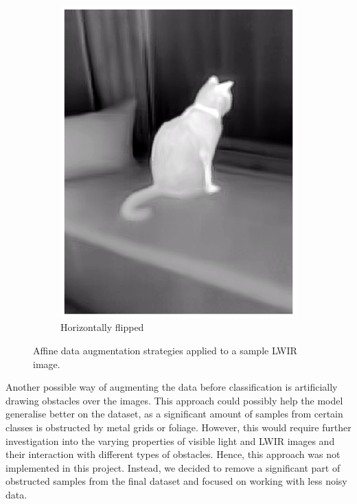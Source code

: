 \documentclass{l4proj}
\begin{document}
\begin{figure}[ht]
\begin{subfigure}[h!]{0.24\textwidth}
    \includegraphics[width=\textwidth]{images/augmentation/flipped.png}
    \caption{Horizontally flipped}
  \end{subfigure}
  \caption{Affine data augmentation strategies applied to a sample LWIR image.}
  \label{fig:augmentation_affine}
\end{figure}

Another possible way of augmenting the data before classification is artificially drawing obstacles over the images. This approach could possibly help the model generalise better on the dataset, as a significant amount of samples from certain classes is obstructed by metal grids or foliage. However, this would require further investigation into the varying properties of visible light and LWIR images and their interaction with different types of obstacles. Hence, this approach was not implemented in this project. Instead, we decided to remove a significant part of obstructed samples from the final dataset and focused on working with less noisy data. 
\end{document}
